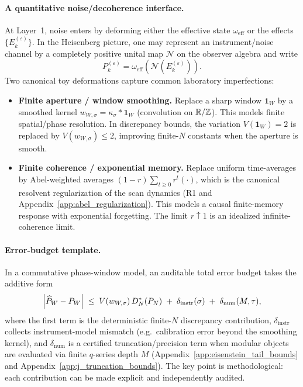 \paragraph{A quantitative noise/decoherence interface.}
At Layer~1, noise enters by deforming either the effective state $\omega_{\mathrm{eff}}$ or the effects $\{E_k^{(\varepsilon)}\}$. In the Heisenberg picture, one may represent an instrument/noise channel by a completely positive unital map $\mathcal{N}$ on the observer algebra and write
\begin{equation}
P_k^{(\varepsilon)}=\omega_{\mathrm{eff}}\!\left(\mathcal{N}\!\left(E_k^{(\varepsilon)}\right)\right).
\label{eq:noise_channel_effects}
\end{equation}
Two canonical toy deformations capture common laboratory imperfections:
\begin{itemize}
  \item \textbf{Finite aperture / window smoothing.}
  Replace a sharp window $\mathbf{1}_W$ by a smoothed kernel $w_{W,\sigma}=\kappa_\sigma * \mathbf{1}_W$ (convolution on $\mathbb{R}/\mathbb{Z}$). This models finite spatial/phase resolution. In discrepancy bounds, the variation $V(\mathbf{1}_W)=2$ is replaced by $V(w_{W,\sigma})\le 2$, improving finite-$N$ constants when the aperture is smooth.

  \item \textbf{Finite coherence / exponential memory.}
  Replace uniform time-averages by Abel-weighted averages $(1-r)\sum_{t\ge 0} r^t(\cdot)$, which is the canonical resolvent regularization of the scan dynamics (R1 and Appendix~\ref{app:abel_regularization}). This models a causal finite-memory response with exponential forgetting. The limit $r\uparrow 1$ is an idealized infinite-coherence limit.
\end{itemize}

\paragraph{Error-budget template.}
In a commutative phase-window model, an auditable total error budget takes the additive form
\begin{equation}
\Bigl|\widehat P_W - P_W\Bigr|
\;\le\;
V(w_{W,\sigma})\,D_N^\ast(P_N)
\;+\;\delta_{\mathrm{instr}}(\sigma)
\;+\;\delta_{\mathrm{num}}(M,\tau),
\label{eq:error_budget_template}
\end{equation}
where the first term is the deterministic finite-$N$ discrepancy contribution, $\delta_{\mathrm{instr}}$ collects instrument-model mismatch (e.g.\ calibration error beyond the smoothing kernel), and $\delta_{\mathrm{num}}$ is a certified truncation/precision term when modular objects are evaluated via finite $q$-series depth $M$ (Appendix~\ref{app:eisenstein_tail_bounds} and Appendix~\ref{app:j_truncation_bounds}). The key point is methodological: each contribution can be made explicit and independently audited.



